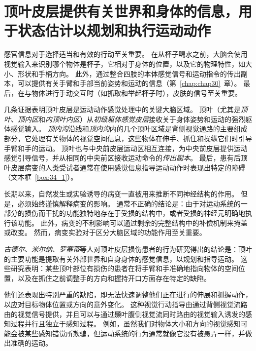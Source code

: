 \section{顶叶皮层提供有关世界和身体的信息，用于状态估计以规划和执行运动动作}

感官信息对于选择适当和有效的行动至关重要。
在从杯子喝水之前，大脑会使用视觉输入来识别哪个物体是杯子，它相对于身体的位置，以及它的物理特性，如大小、形状和手柄方向。
此外，通过整合四肢的本体感觉信号和运动指令的传出副本，可以提供有关手臂和手部当前姿势和运动的信息（第~\ref{chap:chap30}~章）。
最后，在与物体进行手动交互时（如抓取和举起杯子时），皮肤的信号至关重要。


几条证据表明顶叶皮层是运动动作感觉处理中的关键大脑区域。
顶叶（尤其是\textit{顶叶}、\textit{顶内区}和\textit{内顶叶内区}）从\textit{初级躯体感觉皮层}接收关于身体姿势和运动的强烈躯体感觉输入。
\textit{顶内沟}沿线和\textit{顶内沟}内的几个顶叶区域是背侧视觉通路的主要组成部分，它处理有关物体的视觉空间信息，这些物体在伸手、抓住和操纵它们时引导手臂和手的运动。
顶叶也与中央前皮层运动区相互连接，为中央前皮层提供运动感觉引导信号，并从相同的中央前区接收运动命令的\textit{传出副本}。
最后，患有后顶叶皮层病变的人类受试者通常在使用感觉信息指导运动动作时表现出特定的障碍（文本框~\ref{box:34_1}）。



\begin{proposition}[后顶叶皮层的病变研究导致使用感觉信息指导行动的缺陷] \label{box:34_1}
	
	\quad \quad 长期以来，自然发生或实验诱导的病变一直被用来推断不同神经结构的作用。
	但是，必须始终谨慎解释病变的影响。
	通常不正确的结论是：由于对运动系统的一部分的损伤而干扰的功能独特地存在于受损的结构中，或者受损的神经元明确地执行该功能。
	此外，病变的不利影响可以通过剩余的完整结构中的补偿机制来掩盖或改变。
	然而，病变实验对于区分大脑区域的功能作用至关重要。
	
	\quad \quad \textit{古德尔}、\textit{米尔纳}、\textit{罗塞蒂}等人对顶叶皮层损伤患者的行为研究得出的结论是：顶叶的主要功能是提取有关外部世界和自身身体的感觉信息，以规划和指导运动。
	这些研究表明：某些顶叶部位有损伤的患者在将手臂和手准确地指向物体的空间位置，以及在抓住之前调整手的方向和握持开口方面存在特定的缺陷。
	
	\quad \quad 他们还表现出特别严重的缺陷，即无法快速调整他们正在进行的伸展和抓握动作，以应对目标物体位置或方向的意外变化。
	这种视觉行动指导由通过背侧视觉流路由的视觉信号提供，并且可以与通过颞叶腹侧视觉流同时路由的视觉输入诱发的感知过程并行且独立于感知过程。
	例如，虽然我们对物体大小和方向的视觉感知可能会被某些感知错觉所欺骗，但运动系统的行为通常就像它没有被愚弄一样，并做出准确的运动。
	
\end{proposition}



